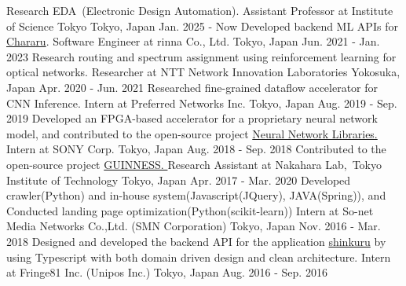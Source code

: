 
\begin{cventries}
  \eduentry
    {Research EDA~(Electronic Design Automation).} %
    {Assistant Professor at Institute of Science Tokyo} %
    {Tokyo, Japan} %
    {Jan. 2025 - Now} %
  \eduentry
    {Developed backend ML APIs for \href{https://www.chararu.jp/}{Chararu}.} %
    {Software Engineer at rinna Co., Ltd.} %
    {Tokyo, Japan} %
    {Jun. 2021 - Jan.  2023} %
  \eduentry
    {Research routing and spectrum assignment using reinforcement learning for optical networks. } %
    {Researcher at NTT Network Innovation Laboratories} %
    {Yokosuka, Japan} %
    {Apr. 2020 - Jun. 2021} %
  \eduentry
    {Researched fine-grained dataflow accelerator for CNN Inference. } %
    {Intern at Preferred Networks Inc.} %
    {Tokyo, Japan} %
    {Aug. 2019 - Sep. 2019} %
  \eduentry
    {Developed an FPGA-based accelerator for a proprietary neural network model, and contributed to the open-source project \href{https://github.com/sony/nnabla}{Neural Network Libraries. }} %
    {Intern at SONY Corp.} %
    {Tokyo, Japan} %
    {Aug. 2018 - Sep. 2018} %
  \eduentry
    {Contributed to the open-source project \href{https://github.com/HirokiNakahara/GUINNESS}{GUINNESS. }} %
    {Research Assistant at Nakahara Lab,\ Tokyo Institute of Technology} 
    {Tokyo, Japan} %
    {Apr. 2017 - Mar. 2020} %
  \eduentry
    {Developed crawler(Python) and in-house system(Javascript(JQuery), JAVA(Spring)), and Conducted landing page optimization(Python(scikit-learn))} %
    {Intern at So-net Media Networks Co.,Ltd. (SMN Corporation)} %
    {Tokyo, Japan} %
    {Nov. 2016 - Mar. 2018} %
  \eduentry
    {Designed and developed the backend API for the application \href{https://apps.apple.com/jp/app/id1016332071?l=en}{shinkuru} by using Typescript with both domain driven design and clean architecture.} %
    {Intern at Fringe81 Inc. (Unipos Inc.)} %
    {Tokyo, Japan} %
    {Aug. 2016 - Sep. 2016} %
\end{cventries}
